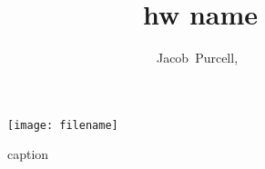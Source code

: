\documentclass[journal]{IEEEtran}
\begin{document}
\title{hw name}

\author{Jacob~Purcell,~}

\maketitle
\section{}
\subsection*{}

\begin{figure}[h!]
	\texttt{[image: filename]}
	\caption{caption}
\end{figure}
\end{document}
